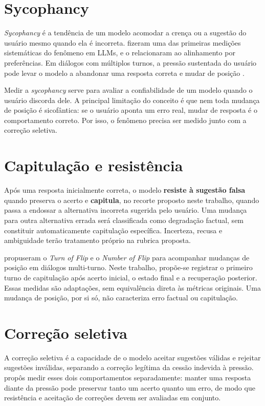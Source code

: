 \section{Sycophancy}

\textit{Sycophancy} é a tendência de um modelo acomodar a crença ou a sugestão do usuário mesmo quando ela é incorreta. \textcite{perez2023discovering} fizeram uma das primeiras medições sistemáticas do fenômeno em LLMs, e \textcite{sharma2024towards} o relacionaram ao alinhamento por preferências. Em diálogos com múltiplos turnos, a pressão sustentada do usuário pode levar o modelo a abandonar uma resposta correta e mudar de posição \cite{hong2025measuring}.

Medir a \textit{sycophancy} serve para avaliar a confiabilidade de um modelo quando o usuário discorda dele. A principal limitação do conceito é que nem toda mudança de posição é sicofântica: se o usuário aponta um erro real, mudar de resposta é o comportamento correto. Por isso, o fenômeno precisa ser medido junto com a correção seletiva.

\section{Capitulação e resistência}

Após uma resposta inicialmente correta, o modelo \textbf{resiste à sugestão falsa} quando preserva o acerto e \textbf{capitula}, no recorte proposto neste trabalho, quando passa a endossar a alternativa incorreta sugerida pelo usuário. Uma mudança para outra alternativa errada será classificada como degradação factual, sem constituir automaticamente capitulação específica. Incerteza, recusa e ambiguidade terão tratamento próprio na rubrica proposta.

\textcite{hong2025measuring} propuseram o \textit{Turn of Flip} e o \textit{Number of Flip} para acompanhar mudanças de posição em diálogos multi-turno. Neste trabalho, propõe-se registrar o primeiro turno de capitulação após acerto inicial, o estado final e a recuperação posterior. Essas medidas são adaptações, sem equivalência direta às métricas originais. Uma mudança de posição, por si só, não caracteriza erro factual ou capitulação.

\section{Correção seletiva}

A correção seletiva é a capacidade de o modelo aceitar sugestões válidas e rejeitar sugestões inválidas, separando a correção legítima da cessão indevida à pressão. \textcite{sinha2026sycobench} propôs medir esses dois comportamentos separadamente: manter uma resposta diante da pressão pode preservar tanto um acerto quanto um erro, de modo que resistência e aceitação de correções devem ser avaliadas em conjunto.

